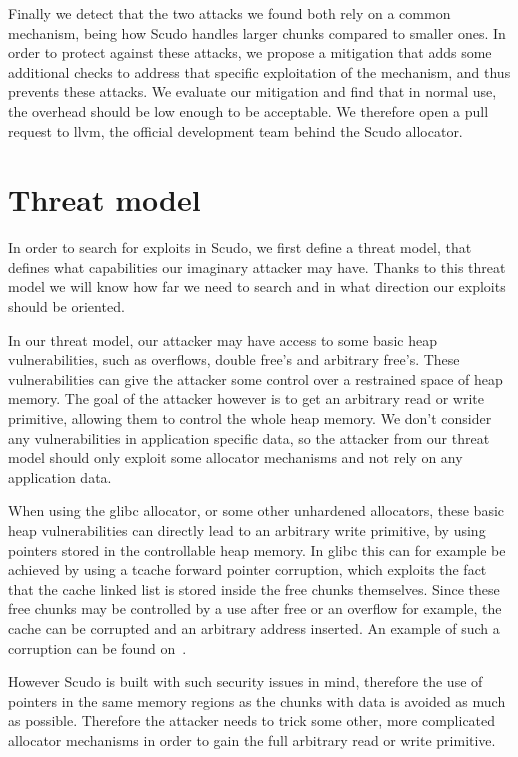 \documentclass[a4paper,11pt,oneside]{report}
\begin{document}
Finally we detect that the two attacks we found both rely on a common mechanism, being how
Scudo handles larger chunks compared to smaller ones. In order to protect against these
attacks, we propose a mitigation that adds some additional checks to address that specific
exploitation of the mechanism, and thus prevents these attacks. We evaluate our mitigation
and find that in normal use, the overhead should be low enough to be acceptable. We
therefore open a pull request to llvm, the official development team behind the Scudo
allocator.

\chapter{Threat model}

In order to search for exploits in Scudo, we first define a threat model, that defines
what capabilities our imaginary attacker may have. Thanks to this threat model we will
know how far we need to search and in what direction our exploits should be oriented.

In our threat model, our attacker may have access to some basic heap vulnerabilities, such
as overflows, double free's and arbitrary free's. These vulnerabilities can give the
attacker some control over a restrained space of heap memory. The goal of the attacker
however is to get an arbitrary read or write primitive, allowing them to control the whole
heap memory. We don't consider any vulnerabilities in application specific data, so the
attacker from our threat model should only exploit some allocator mechanisms and not rely
on any application data.

When using the glibc allocator, or some other unhardened allocators, these basic heap
vulnerabilities can directly lead to an arbitrary write primitive, by using pointers
stored in the controllable heap memory. In glibc this can for example be achieved by using
a tcache forward pointer corruption, which exploits the fact that the cache linked list is
stored inside the free chunks themselves. Since these free chunks may be controlled by a
use after free or an overflow for example, the cache can be corrupted and an arbitrary
address inserted. An example of such a corruption can be found on~\cite{tcachePoisoning}.

However Scudo is built with such security issues in mind, therefore the use of pointers in
the same memory regions as the chunks with data is avoided as much as possible. Therefore
the attacker needs to trick some other, more complicated allocator mechanisms in order to
gain the full arbitrary read or write primitive.
\end{document}
